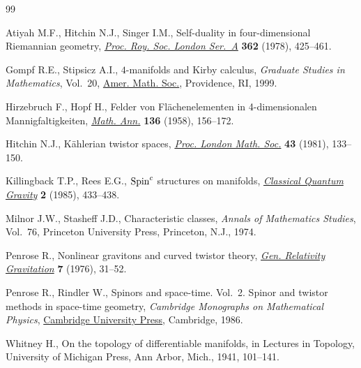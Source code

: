 \begin{thebibliography}{99}
\footnotesize\itemsep=-1pt

Atiyah M.F., Hitchin N.J., Singer I.M., Self-duality in four-dimensional
 {R}iemannian geometry, \href{https://doi.org/10.1098/rspa.1978.0143}{\textit{Proc. Roy. Soc. London Ser.~A}} \textbf{362}
 (1978), 425--461.

Gompf R.E., Stipsicz A.I., {$4$}-manifolds and {K}irby calculus,
 \textit{Graduate Studies in Mathematics}, Vol.~20, \href{https://doi.org/10.1090/gsm/020}{Amer. Math.
 Soc.}, Providence, RI, 1999.

Hirzebruch F., Hopf H., Felder von {F}l\"achenelementen in 4-dimensionalen
 {M}annigfaltigkeiten, \href{https://doi.org/10.1007/BF01362296}{\textit{Math. Ann.}} \textbf{136} (1958), 156--172.

Hitchin N.J., K\"ahlerian twistor spaces, \href{https://doi.org/10.1112/plms/s3-43.1.133}{\textit{Proc. London Math. Soc.}}
 \textbf{43} (1981), 133--150.

Killingback T.P., Rees E.G., {${\rm Spin}^c$} structures on manifolds,
 \href{https://doi.org/10.1088/0264-9381/2/4/008}{\textit{Classical Quantum Gravity}} \textbf{2} (1985), 433--438.

Milnor J.W., Stasheff J.D., Characteristic classes, \textit{Annals of
 Mathematics Studies}, Vol.~76, Princeton University Press, Princeton, N.J.,
 1974.

Penrose R., Nonlinear gravitons and curved twistor theory, \href{https://doi.org/10.1007/bf00762011}{\textit{Gen.
 Relativity Gravitation}} \textbf{7} (1976), 31--52.

Penrose R., Rindler W., Spinors and space-time. {V}ol.~2. Spinor and twistor
 methods in space-time geometry, \textit{Cambridge Monographs on Mathematical Physics},
 \href{https://doi.org/10.1017/CBO9780511524486}{Cambridge University Press}, Cambridge, 1986.

Whitney H., On the topology of differentiable manifolds, in Lectures in
 {T}opology, University of Michigan Press, Ann Arbor, Mich., 1941, 101--141.\LastPageEnding

\end{thebibliography}
